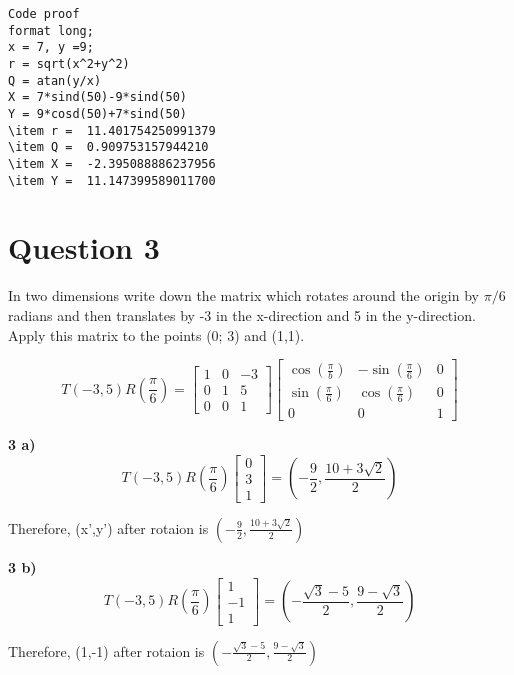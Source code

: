 \documentclass{article}
\begin{document}
\begin{verbatim}
Code proof
format long;
x = 7, y =9;
r = sqrt(x^2+y^2)
Q = atan(y/x)
X = 7*sind(50)-9*sind(50)
Y = 9*cosd(50)+7*sind(50)
\item r =  11.401754250991379
\item Q =  0.909753157944210
\item X =  -2.395088886237956
\item Y =  11.147399589011700
\end{verbatim}

\section{Question 3}
\item In two dimensions write down the matrix which rotates around
the origin by $\pi/6$ radians and then translates by -3 in the x-direction and 5 in
the y-direction. Apply this matrix to the points (0; 3) and (1,1).

\begin{equation}
T(-3,5) R\left(\frac{\pi}{6}\right)=\left[\begin{array}{ccc}
1 & 0 & -3 \\
0 & 1 & 5 \\
0 & 0 & 1
\end{array}\right]\left[\begin{array}{ccc}
\cos \left(\frac{\pi}{b}\right) & -\sin \left(\frac{\pi}{6}\right) & 0 \\
\sin \left(\frac{\pi}{6}\right) & \cos \left(\frac{\pi}{6}\right) & 0 \\
0 & 0 & 1
\end{array}\right]
\end{equation}


\item \textbf{3 a) }
\begin{equation}
T(-3,5) R\left(\frac{\pi}{6}\right)\begin{bmatrix}
0\\3\\1
\end{bmatrix} = (-\frac{9}{2}, \frac{10+3\sqrt{2}}{2})
\end{equation}
\item Therefore, (x',y') after rotaion is $(-\frac{9}{2}, \frac{10+3\sqrt{2}}{2})$
\item \textbf{3 b) }
\begin{equation}
T(-3,5) R\left(\frac{\pi}{6}\right)\begin{bmatrix}
1\\-1\\1
\end{bmatrix} = (-\frac{\sqrt{3}-5}{2}, \frac{9-\sqrt{3}}{2})
\end{equation}
\item Therefore, (1,-1) after rotaion is $(-\frac{\sqrt{3}-5}{2}, \frac{9-\sqrt{3}}{2})$
\end{document}
